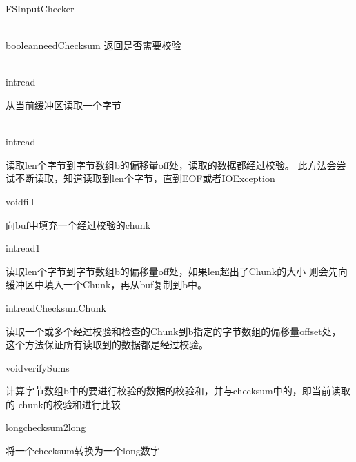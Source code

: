 \begin{XeClass}{FSInputChecker}
\begin{XeMethod}{\XeProtected \\ \XeSync}{boolean}{needChecksum}
 返回是否需要校验

    \end{XeMethod}

    \begin{XeMethod}{\XePublic \\ \XeSync}{int}{read}
         
 从当前缓冲区读取一个字节

    \end{XeMethod}

    \begin{XeMethod}{\XePublic \\ \XeSync}{int}{read}
         
 读取len个字节到字节数组b的偏移量off处，读取的数据都经过校验。
 此方法会尝试不断读取，知道读取到len个字节，直到EOF或者IOException

    \end{XeMethod}

    \begin{XeMethod}{\XePrivate}{void}{fill}
         
 向buf中填充一个经过校验的chunk

    \end{XeMethod}

    \begin{XeMethod}{\XePrivate}{int}{read1}
         
 读取len个字节到字节数组b的偏移量off处，如果len超出了Chunk的大小
 则会先向缓冲区中填入一个Chunk，再从buf复制到b中。

    \end{XeMethod}

    \begin{XeMethod}{\XePrivate}{int}{readChecksumChunk}
         
 读取一个或多个经过校验和检查的Chunk到b指定的字节数组的偏移量offset处，
 这个方法保证所有读取到的数据都是经过校验。

    \end{XeMethod}

    \begin{XeMethod}{\XePrivate}{void}{verifySums}
         
 计算字节数组b中的要进行校验的数据的校验和，并与checksum中的，即当前读取的
 chunk的校验和进行比较

    \end{XeMethod}

    \begin{XeMethod}{\XePublic}{long}{checksum2long}
         
 将一个checksum转换为一个long数字


\end{XeMethod}
\end{XeClass}
